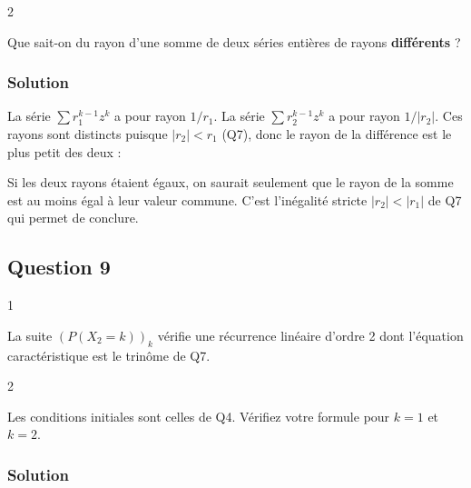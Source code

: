 \documentclass[11pt,a4paper]{article}
\newcommand{\equationajustee}[1]{%
  \sbox{\boiteequation}{$\displaystyle #1$}%
  \ifdim\wd\boiteequation>\linewidth
    \[\resizebox{\linewidth}{!}{\usebox{\boiteequation}}\]%
  \else
    \[#1\]%
  \fi}
\begin{document}
\begin{indication}{2}

Que sait-on du rayon d'une somme de deux séries entières de rayons \textbf{différents} ?

\end{indication}

\hypertarget{solution-7}{%
\subsubsection{Solution}\label{solution-7}}

La série \(\sum r_1^{k-1}z^k\) a pour rayon \(1/r_1\). La série \(\sum r_2^{k-1}z^k\) a pour rayon \(1/|r_2|\). Ces rayons sont distincts puisque \(|r_2|<r_1\) (Q7), donc le rayon de la différence est le plus petit des deux :
\equationajustee{\boxed{R=\frac1{r_1}>1.}}

\begin{piege}

Si les deux rayons étaient égaux, on saurait seulement que le rayon de la somme est au moins égal à leur valeur commune. C'est l'inégalité stricte \(|r_2|<|r_1|\) de Q7 qui permet de conclure.

\end{piege}

\hypertarget{question-9}{%
\subsection{Question 9}\label{question-9}}

\begin{indication}{1}

La suite \((P(X_2=k))_k\) vérifie une récurrence linéaire d'ordre 2 dont l'équation caractéristique est le trinôme de Q7.

\end{indication}

\begin{indication}{2}

Les conditions initiales sont celles de Q4. Vérifiez votre formule pour \(k=1\) et \(k=2\).

\end{indication}

\hypertarget{solution-8}{%
\subsubsection{Solution}\label{solution-8}}
\end{document}
